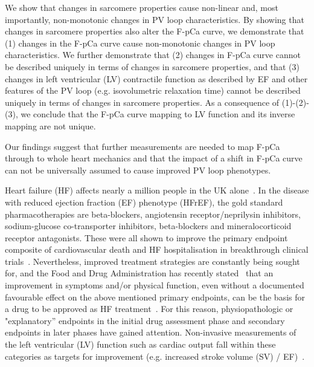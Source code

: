 We show that changes in sarcomere properties cause non-linear and, most importantly, non-monotonic changes in PV loop characteristics. By showing that changes in sarcomere properties also alter the F-pCa curve, we demonstrate that (1) changes in the F-pCa curve cause non-monotonic changes in PV loop characteristics. We further demonstrate that (2) changes in F-pCa curve cannot be described uniquely in terms of changes in sarcomere properties, and that (3) changes in left ventricular (LV) contractile function as described by EF and other features of the PV loop (e.g. isovolumetric relaxation time) cannot be described uniquely in terms of changes in sarcomere properties. As a consequence of (1)-(2)-(3), we conclude that the F-pCa curve mapping to LV function and its inverse mapping are not unique.

Our findings suggest that further measurements are needed to map F-pCa through to whole heart mechanics and that the impact of a shift in F-pCa curve can not be universally assumed to cause improved PV loop phenotypes.

\vspace{0.2cm}\noindent
{}

\noindent
Heart failure (HF) affects nearly a million people in the UK alone~\cite{Bhf:2021}. In the disease with reduced ejection fraction (EF) phenotype (HFrEF), the gold standard pharmacotherapies are beta-blockers, angiotensin receptor/neprilysin inhibitors, sodium-glucose co-transporter inhibitors, beta-blockers and mineralocorticoid receptor antagonists. These were all shown to improve the primary endpoint composite of cardiovascular death and HF hospitalisation in breakthrough clinical trials~\cite{Debska-Kozlowska:2021}. Nevertheless, improved treatment strategies are constantly being sought for, and the Food and Drug Administration has recently stated~\cite{FDA:2019} that an improvement in symptoms and/or physical function, even without a documented favourable effect on the above mentioned primary endpoints, can be the basis for a drug to be approved as HF treatment~\cite{Fiuzat:2020}. For this reason, physiopathologic or "explanatory'' endpoints in the initial drug assessment phase and secondary endpoints in later phases have gained attention. Non-invasive measurements of the left ventricular (LV) function such as cardiac output fall within these categories as targets for improvement (e.g. increased stroke volume (SV) / EF)~\cite{Zanolla:2003}.

